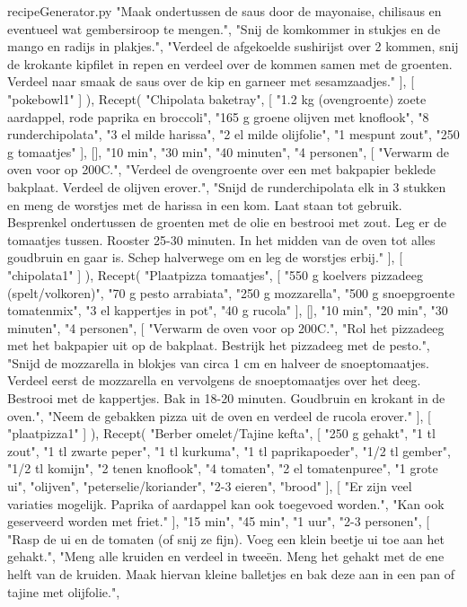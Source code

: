 \begin{filecontents*}{recipeGenerator.py}
		"Maak ondertussen de saus door de mayonaise, chilisaus en eventueel wat gembersiroop te mengen.",
		"Snij de komkommer in stukjes en de mango en radijs in plakjes.",
		"Verdeel de afgekoelde sushirijst over 2 kommen, snij de krokante kipfilet in repen en verdeel over de kommen samen met de groenten. Verdeel naar smaak de saus over de kip en garneer met sesamzaadjes."
	],
	[
		"pokebowl1"
	]
),
Recept(
	"Chipolata baketray",
	[
		"1.2 kg (ovengroente) zoete aardappel, rode paprika en broccoli",
		"165 g groene olijven met knoflook",
		"8 runderchipolata",
		"3 el milde harissa",
		"2 el milde olijfolie",
		"1 mespunt zout",
		"250 g tomaatjes"
	],
	[],
	"10 min",
	"30 min",
	"40 minuten",
	"4 personen",
	[
		"Verwarm de oven voor op 200\degree C.",
		"Verdeel de ovengroente over een met bakpapier beklede bakplaat. Verdeel de olijven erover.",
		"Snijd de runderchipolata elk in 3 stukken en meng de worstjes met de harissa in een kom. Laat staan tot gebruik. Besprenkel ondertussen de groenten met de olie en bestrooi met zout. Leg er de tomaatjes tussen. Rooster 25-30 minuten. In het midden van de oven tot alles goudbruin en gaar is. Schep halverwege om en leg de worstjes erbij."
	],
	[
		"chipolata1"
	]
),
Recept(
	"Plaatpizza tomaatjes",
	[
		"550 g koelvers pizzadeeg (spelt/volkoren)",
		"70 g pesto arrabiata",
		"250 g mozzarella",
		"500 g snoepgroente tomatenmix",
		"3 el kappertjes in pot",
		"40 g rucola"
	],
	[],
	"10 min",
	"20 min",
	"30 minuten",
	"4 personen",
	[
		"Verwarm de oven voor op 200\degree C.",
		"Rol het pizzadeeg met het bakpapier uit op de bakplaat. Bestrijk het pizzadeeg met de pesto.",
		"Snijd de mozzarella in blokjes van circa 1 cm en halveer de snoeptomaatjes. Verdeel eerst de mozzarella en vervolgens de snoeptomaatjes over het deeg. Bestrooi met de kappertjes. Bak in 18-20 minuten. Goudbruin en krokant in de oven.",
		"Neem de gebakken pizza uit de oven en verdeel de rucola erover."
	],
	[
		"plaatpizza1"
	]
),
Recept(
	"Berber omelet/Tajine kefta",
	[
		"250 g gehakt",
		"1 tl zout",
		"1 tl zwarte peper",
		"1 tl kurkuma",
		"1 tl paprikapoeder",
		"1/2 tl gember",
		"1/2 tl komijn",
		"2 tenen knoflook",
		"4 tomaten",
		"2 el tomatenpuree",
		"1 grote ui",
		"olijven",
		"peterselie/koriander",
		"2-3 eieren",
		"brood"
	],
	[
		"Er zijn veel variaties mogelijk. Paprika of aardappel kan ook toegevoed worden.",
		"Kan ook geserveerd worden met friet."
	],
	"15 min",
	"45 min",
	"1 uur",
	"2-3 personen",
	[
		"Rasp de ui en de tomaten (of snij ze fijn). Voeg een klein beetje ui toe aan het gehakt.",
		"Meng alle kruiden en verdeel in tweeën. Meng het gehakt met de ene helft van de kruiden. Maak hiervan kleine balletjes en bak deze aan in een pan of tajine met olijfolie.",

\end{filecontents*}
